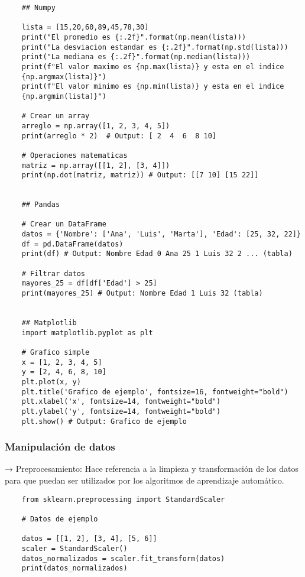 \documentclass{templateNote}
\begin{document}
\begin{lstlisting}
    ## Numpy

    lista = [15,20,60,89,45,78,30]
    print("El promedio es {:.2f}".format(np.mean(lista)))
    print("La desviacion estandar es {:.2f}".format(np.std(lista)))
    print("La mediana es {:.2f}".format(np.median(lista)))
    print(f"El valor maximo es {np.max(lista)} y esta en el indice 
    {np.argmax(lista)}")
    print(f"El valor minimo es {np.min(lista)} y esta en el indice 
    {np.argmin(lista)}")

    # Crear un array
    arreglo = np.array([1, 2, 3, 4, 5])
    print(arreglo * 2)  # Output: [ 2  4  6  8 10]

    # Operaciones matematicas
    matriz = np.array([[1, 2], [3, 4]])
    print(np.dot(matriz, matriz)) # Output: [[7 10] [15 22]]


    ## Pandas

    # Crear un DataFrame
    datos = {'Nombre': ['Ana', 'Luis', 'Marta'], 'Edad': [25, 32, 22]}
    df = pd.DataFrame(datos)
    print(df) # Output: Nombre Edad 0 Ana 25 1 Luis 32 2 ... (tabla)

    # Filtrar datos
    mayores_25 = df[df['Edad'] > 25]
    print(mayores_25) # Output: Nombre Edad 1 Luis 32 (tabla)


    ## Matplotlib
    import matplotlib.pyplot as plt

    # Grafico simple
    x = [1, 2, 3, 4, 5]
    y = [2, 4, 6, 8, 10]
    plt.plot(x, y)
    plt.title('Grafico de ejemplo', fontsize=16, fontweight="bold")
    plt.xlabel('x', fontsize=14, fontweight="bold")
    plt.ylabel('y', fontsize=14, fontweight="bold")
    plt.show() # Output: Grafico de ejemplo 
\end{lstlisting}

\newpage
\subsubsection*{Manipulación de datos}

\noindent → Preprocesamiento: Hace referencia a la limpieza y transformación de los datos para que puedan ser utilizados por los algoritmos de aprendizaje automático.
\begin{lstlisting}
    from sklearn.preprocessing import StandardScaler

    # Datos de ejemplo

    datos = [[1, 2], [3, 4], [5, 6]]
    scaler = StandardScaler()
    datos_normalizados = scaler.fit_transform(datos)
    print(datos_normalizados)
\end{lstlisting}
\end{document}

